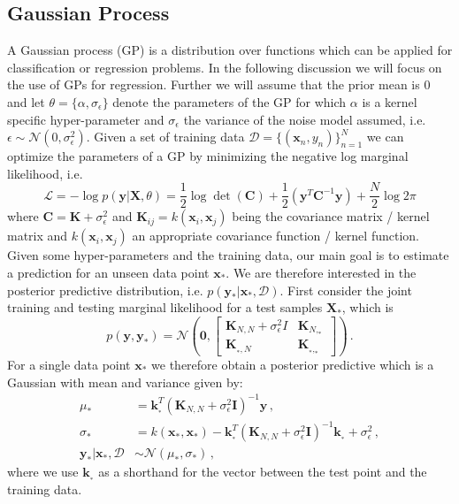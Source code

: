 \documentclass[10pt,letterpaper]{article}
\newcommand\N{\ensuremath{\mathcal{N}}}
\newcommand{\X}{\mathbf{X}}
\newcommand{\C}{\mathbf{C}}
\newcommand{\loss}{\mathcal{L}}
\newcommand{\K}{\mathbf{K}}
\newcommand{\kk}{\mathbf{k}}
\newcommand{\data}{\mathcal{D}}
\newcommand{\x}{\mathbf{x}}
\newcommand{\y}{\mathbf{y}}
\newcommand{\xn}{\mathbf{x}_{n}}
\newcommand{\new}{_{*}}
\theoremstyle{mystyle}
\begin{document}
\subsection{Gaussian Process} \label{sec:gps}
A Gaussian process (GP) is a distribution over functions which can be applied for classification or regression problems.
In the following discussion we will focus on the use of GPs for regression.
Further we will assume that the prior mean is $0$ and let $\theta = \{\alpha, \sigma_{\epsilon}\}$ denote the parameters of the GP for which $\alpha$ is a kernel specific hyper-parameter and $\sigma_{\epsilon}$ the variance of the noise model assumed, i.e. $\epsilon \sim \N(0, \sigma_{\epsilon}^2)$.
Given a set of training data $\data = \{(\xn, y_n)\}_{n=1}^{N}$ we can optimize the parameters of a GP by minimizing the negative log marginal likelihood, i.e.
\begin{equation}
  \loss = - \log p(\y | \X, \theta) = \frac{1}{2} \log \det(\C) + \frac{1}{2}(\y^T \C^{-1} \y) + \frac{N}{2} \log 2\pi
\end{equation}
where $\C = \K + \sigma^2_{\epsilon}$ and $\K_{ij} = k(\x_i, \x_j)$ being the covariance matrix / kernel matrix and $k(\x_i, \x_j)$ an appropriate covariance function / kernel function.
Given some hyper-parameters and the training data, our main goal is to estimate a prediction for an unseen data point $\x\new$. 
We are therefore interested in the posterior predictive distribution, i.e. $p(\y\new | \x\new, \data)$.
First consider the joint training and testing marginal likelihood for a test samples $\X\new$, which is
\[
  p(\y, \y\new) = \N(\bm 0, \left[\begin{array}{cc}
\K_{N,N} + \sigma^2_{\epsilon}I & \K_{N,\new} \\
\K_{\new,N} & \K_{\new,\new} \end{array} \right]) \, .
\]
For a single data point $\x\new$ we therefore obtain a posterior predictive which is a Gaussian with mean and variance given by:
\begin{align}
  \mu\new &= \kk_{\new}^T (\K_{N,N} + \sigma^2_{\epsilon}\bm I)^{-1} \y \, ,\\
  \sigma\new &= k(\x\new, \x\new) - \kk_{\new}^T(\K_{N,N} + \sigma^2_{\epsilon}\bm I)^{-1} \kk_{\new} + \sigma^2_{\epsilon} \, ,\\
  \y\new | \x\new, \data &\sim \N(\mu\new, \sigma\new)\, , \label{eq:posteriorGP}
\end{align}
where we use $\kk_{\new}$ as a shorthand for the vector between the test point and the training data.
\end{document}
